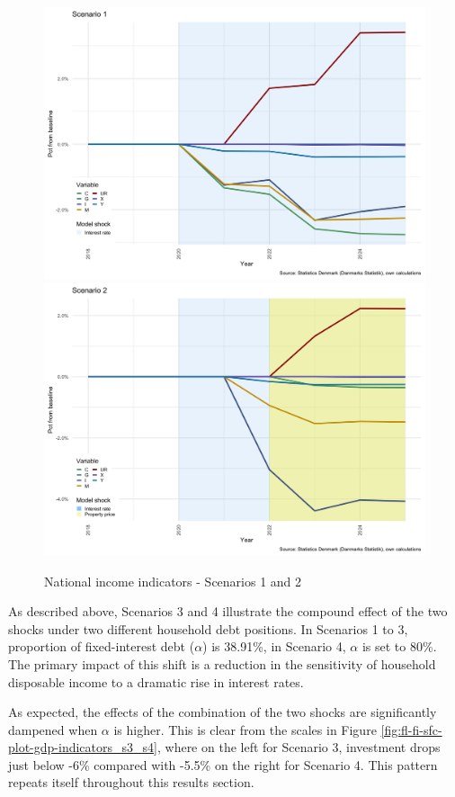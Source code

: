 \documentclass[
]{book}
\begin{document}
\begin{figure}[H]
\includegraphics[width=0.5\linewidth]{figures/fl-fi-sfc-plot-gdp-indicators-s1-s2-1} \includegraphics[width=0.5\linewidth]{figures/fl-fi-sfc-plot-gdp-indicators-s1-s2-2} \caption{National income indicators - Scenarios 1 and 2}\label{fig:fl-fi-sfc-plot-gdp-indicators-s1-s2}
\end{figure}

As described above, Scenarios 3 and 4 illustrate the compound effect of the two shocks under two different household debt positions. In Scenarios 1 to 3, proportion of fixed-interest debt (\(\alpha\)) is 38.91\%, in Scenario 4, \(\alpha\) is set to 80\%. The primary impact of this shift is a reduction in the sensitivity of household disposable income to a dramatic rise in interest rates.

As expected, the effects of the combination of the two shocks are significantly dampened when \(\alpha\) is higher. This is clear from the scales in Figure \ref{fig:fl-fi-sfc-plot-gdp-indicators_s3_s4}, where on the left for Scenario 3, investment drops just below -6\% compared with -5.5\% on the right for Scenario 4. This pattern repeats itself throughout this results section.
\end{document}
